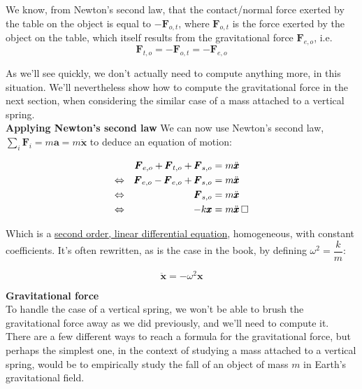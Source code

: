\documentclass[solutions.tex]{subfiles}
\renewcommand{\bm}[1]{\pmb{#1}}
\renewcommand{\qed}{\,\relax\ifmmode\Box\else$\Box$\fi}
\begin{document}
We know, from Newton's second law, that the contact/normal
force exerted by the table on the object is equal to $-\bm{F}_{o,t}$,
where $\bm{F}_{o,t}$ is the force exerted by the object on the table,
which itself results from the gravitational force $\bm{F}_{e,o}$, i.e.
\[
	\bm{F}_{t,o} = -\bm{F}_{o,t} = -\bm{F}_{e,o}
\]

As we'll see quickly, we don't actually need to compute anything
more, in this situation. We'll nevertheless show how to compute the
gravitational force in the next section, when considering the
similar case of a mass attached to a vertical spring. \\

\textbf{Applying Newton's second law}  We can now use Newton's second
law, $\sum_i \bm{F}_i = m\bm{a} = m\ddot{\bm{x}}$ to deduce an
equation of motion:

\begin{equation*} \begin{aligned}
	~ && \bm{F}_{e,o} + \bm{F}_{t,o} + \bm{F}_{s,o} &= m\ddot{\bm{x}} \\
	\Leftrightarrow && \bm{F}_{e,o} - \bm{F}_{e,o} + \bm{F}_{s,o} &= m\ddot{\bm{x}} \\
	\Leftrightarrow && \bm{F}_{s,o} &= m\ddot{\bm{x}} \\
	\Leftrightarrow && -k\bm{x} &= m\ddot{\bm{x}} \qed
\end{aligned} \end{equation*}

Which is a \href{https://en.wikipedia.org/wiki/Linear\_differential\_equation\#Second\-order\_case}
{second order, linear differential equation}, homogeneous, with constant
coefficients. It's often rewritten, as is the case in the book,
by defining $\omega^2 = \dfrac{k}{m}$:

\[ \boxed{\ddot{\bm{x}} = -\omega^2\bm{x}} \]

\hr
\textbf{Gravitational force} \\
To handle the case of a vertical spring, we won't be able to brush
the gravitational force away as we did previously, and we'll need to
compute it. \\

There are a few different ways to reach a formula for the
gravitational force, but perhaps the simplest one, in the context of
studying a mass attached to a vertical spring, would be to empirically
study the fall of an object of mass $m$ in Earth's gravitational
field. \\
\end{document}
